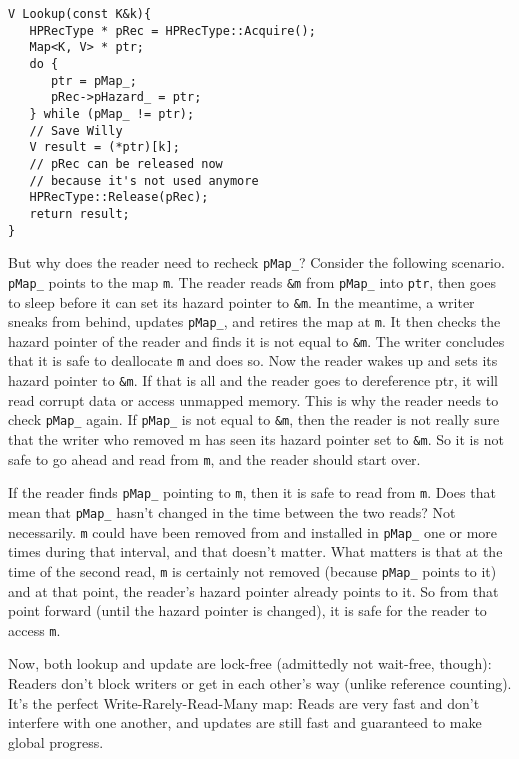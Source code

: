 \documentclass[a4paper,12pt,notitlepage,twoside,openright]{article}
\begin{document}
\begin{verbatim}
V Lookup(const K&k){
   HPRecType * pRec = HPRecType::Acquire();
   Map<K, V> * ptr;
   do {
      ptr = pMap_;
      pRec->pHazard_ = ptr;
   } while (pMap_ != ptr);
   // Save Willy
   V result = (*ptr)[k];
   // pRec can be released now
   // because it's not used anymore
   HPRecType::Release(pRec);
   return result;
}
\end{verbatim}

But why does the reader need to recheck \texttt{pMap\_}? Consider the following scenario. \texttt{pMap\_} points to the map \texttt{m}. The reader reads \texttt{\&m} from \texttt{pMap\_} into \texttt{ptr}, then goes to sleep before it can set its hazard pointer to \texttt{\&m}. In the meantime, a writer sneaks from behind, updates \texttt{pMap\_}, and retires the map at \texttt{m}. It then checks the hazard pointer of the reader and finds it is not equal to \texttt{\&m}. The writer concludes that it is safe to deallocate \texttt{m} and does so. Now the reader wakes up and sets its hazard pointer to \texttt{\&m}. If that is all and the reader goes to dereference ptr, it will read corrupt data or access unmapped memory. This is why the reader needs to check \texttt{pMap\_} again. If \texttt{pMap\_} is not equal to \texttt{\&m}, then the reader is not really sure that the writer who removed m has seen its hazard pointer set to \texttt{\&m}. So it is not safe to go ahead and read from \texttt{m}, and the reader should start over.

If the reader finds \texttt{pMap\_} pointing to \texttt{m}, then it is safe to read from \texttt{m}. Does that mean that \texttt{pMap\_} hasn't changed in the time between the two reads? Not necessarily. \texttt{m} could have been removed from and installed in \texttt{pMap\_} one or more times during that interval, and that doesn't matter. What matters is that at the time of the second read, \texttt{m} is certainly not removed (because \texttt{pMap\_} points to it) and at that point, the reader's hazard pointer already points to it. So from that point forward (until the hazard pointer is changed), it is safe for the reader to access \texttt{m}.

Now, both lookup and update are lock-free (admittedly not wait-free, though): Readers don't block writers or get in each other's way (unlike reference counting). It's the perfect Write-Rarely-Read-Many map: Reads are very fast and don't interfere with one another, and updates are still fast and guaranteed to make global progress.
\end{document}
